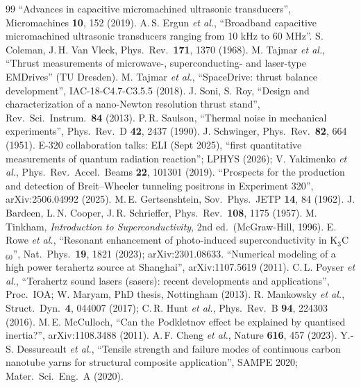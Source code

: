 \begin{thebibliography}{99}
 ``Advances in capacitive micromachined ultrasonic transducers'', Micromachines \textbf{10}, 152 (2019).
 A.\,S. Ergun \emph{et al.}, ``Broadband capacitive micromachined ultrasonic transducers ranging from 10 kHz to 60 MHz''.
 S. Coleman, J.\,H. Van Vleck, Phys.\ Rev.\ \textbf{171}, 1370 (1968).
 M. Tajmar \emph{et al.}, ``Thrust measurements of microwave-, superconducting- and laser-type EMDrives'' (TU Dresden).
 M. Tajmar \emph{et al.}, ``SpaceDrive: thrust balance development'', IAC-18-C4.7-C3.5.5 (2018).
 J. Soni, S. Roy, ``Design and characterization of a nano-Newton resolution thrust stand'', Rev.\ Sci.\ Instrum.\ \textbf{84} (2013).
 P.\,R. Saulson, ``Thermal noise in mechanical experiments'', Phys.\ Rev.\ D \textbf{42}, 2437 (1990).
 J. Schwinger, Phys.\ Rev.\ \textbf{82}, 664 (1951).
 E-320 collaboration talks: ELI (Sept 2025), ``first quantitative measurements of quantum radiation reaction''; LPHYS (2026); V. Yakimenko \emph{et al.}, Phys.\ Rev.\ Accel.\ Beams \textbf{22}, 101301 (2019).
 ``Prospects for the production and detection of Breit--Wheeler tunneling positrons in Experiment 320'', arXiv:2506.04992 (2025).
 M.\,E. Gertsenshtein, Sov.\ Phys.\ JETP \textbf{14}, 84 (1962).
 J. Bardeen, L.\,N. Cooper, J.\,R. Schrieffer, Phys.\ Rev.\ \textbf{108}, 1175 (1957).
 M. Tinkham, \emph{Introduction to Superconductivity}, 2nd ed.\ (McGraw-Hill, 1996).
 E. Rowe \emph{et al.}, ``Resonant enhancement of photo-induced superconductivity in K$_3$C$_{60}$'', Nat.\ Phys.\ \textbf{19}, 1821 (2023); arXiv:2301.08633.
 ``Numerical modeling of a high power terahertz source at Shanghai'', arXiv:1107.5619 (2011).
 C.\,L. Poyser \emph{et al.}, ``Terahertz sound lasers (sasers): recent developments and applications'', Proc.\ IOA; W. Maryam, PhD thesis, Nottingham (2013).
 R. Mankowsky \emph{et al.}, Struct.\ Dyn.\ \textbf{4}, 044007 (2017); C.\,R. Hunt \emph{et al.}, Phys.\ Rev.\ B \textbf{94}, 224303 (2016).
 M.\,E. McCulloch, ``Can the Podkletnov effect be explained by quantised inertia?'', arXiv:1108.3488 (2011).
 A.\,F. Cheng \emph{et al.}, Nature \textbf{616}, 457 (2023).
 Y.-S. Dessureault \emph{et al.}, ``Tensile strength and failure modes of continuous carbon nanotube yarns for structural composite application'', SAMPE 2020; Mater.\ Sci.\ Eng.\ A (2020).

\end{thebibliography}
